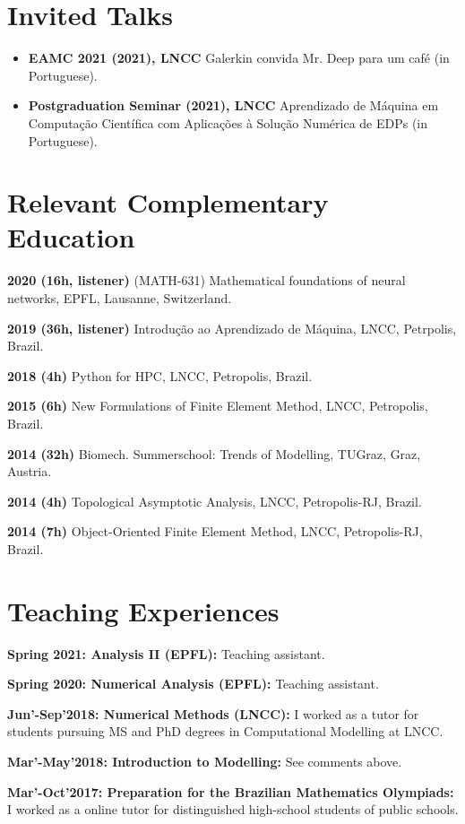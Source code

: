 \documentclass[11pt,letterpaper]{twentysecondcv} %
\begin{document}
\section{Invited Talks}
\begin{itemize}
\item \textbf{EAMC 2021 (2021), LNCC} Galerkin convida Mr. Deep para um café (in Portuguese).
\item \textbf{Postgraduation Seminar (2021), LNCC} Aprendizado de Máquina em Computação Científica com Aplicações à Solução Numérica de EDPs (in Portuguese).
\end{itemize}

\section{Relevant Complementary Education}
\item \textbf{2020 (16h, listener)} (MATH-631) Mathematical foundations of neural networks, EPFL, Lausanne, Switzerland.
\item \textbf{2019 (36h, listener)} Introdução ao Aprendizado de Máquina, LNCC, Petrpolis, Brazil.
\item \textbf{2018 (4h)} Python for HPC, LNCC, Petropolis, Brazil.
\item \textbf{2015 (6h) } New Formulations of Finite Element Method, LNCC, Petropolis, Brazil.
\item \textbf{2014 (32h) } Biomech. Summerschool: Trends of Modelling, TUGraz, Graz, Austria.
\item \textbf{2014 (4h) } Topological Asymptotic Analysis, LNCC, Petropolis-RJ, Brazil. 
\item \textbf{2014 (7h) } Object-Oriented Finite Element Method, LNCC, Petropolis-RJ, Brazil.

\section{Teaching Experiences}
\item \textbf{Spring 2021: Analysis II (EPFL):} Teaching assistant.
\item \textbf{Spring 2020: Numerical Analysis (EPFL):} Teaching assistant.
\item \textbf{Jun'-Sep'2018: Numerical Methods (LNCC):} I worked as a tutor for students pursuing MS and PhD degrees in Computational Modelling at LNCC.
\item \textbf{Mar'-May'2018: Introduction to Modelling:} See comments above.
\item \textbf{Mar'-Oct'2017: Preparation for the Brazilian Mathematics Olympiads:} I worked as a online tutor for distinguished high-school students of public schools.
\end{document}
